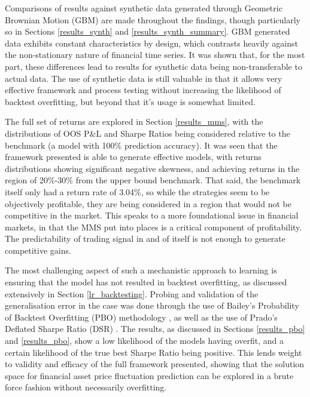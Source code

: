 \documentclass[a4paper,11pt,oneside]{article}
\theoremstyle{plain}
\theoremstyle{definition}
\begin{document}
	Comparisons of results against synthetic data generated through Geometric Brownian Motion (GBM) are made throughout the findings, though particularly so in Sections \ref{results_synth} and \ref{results_synth_summary}. GBM generated data exhibits constant characteristics by design, which contrasts heavily against the non-stationary nature of financial time series. It was shown that, for the most part, these differences lead to results for synthetic data being non-transferable to actual data. The use of synthetic data is still valuable in that it allows very effective framework and process testing without increasing the likelihood of backtest overfitting, but beyond that it's usage is somewhat limited. \newline
	
	The full set of returns are explored in Section \ref{results_mms}, with the distributions of OOS P\&L and Sharpe Ratios being considered relative to the benchmark (a model with 100\% prediction accuracy). It was seen that the framework presented is able to generate effective models, with returns distributions showing significant negative skewness, and achieving returns in the region of 20\%-30\% from the upper bound benchmark. That said, the benchmark itself only had a return rate of 3.04\%, so while the strategies seem to be objectively profitable, they are being considered in a region that would not be competitive in the market. This speaks to a more foundational issue in financial markets, in that the MMS put into places is a critical component of profitability. The predictability of trading signal in and of itself is not enough to generate competitive gains.\newline
	
	The most challenging aspect of such a mechanistic approach to learning is ensuring that the model has not resulted in backtest overfitting, as discussed extensively in Section \ref{lr_backtesting}. Probing and validation of the generalisation error in the case was done through the use of Bailey's Probability of Backtest Overfitting (PBO) methodology \citep{BailyPBO}, as well as the use of Prado's Deflated Sharpe Ratio (DSR) \citep{PradoDSR}. The results, as discussed in Sections \ref{results_pbo} and \ref{results_pbo}, show a low likelihood of the models having overfit, and a certain likelihood of the true best Sharpe Ratio being positive. This lends weight to validity and efficacy of the full framework presented, showing that the solution space for financial asset price fluctuation prediction can be explored in a brute force fashion without necessarily overfitting.\newline
\end{document}
